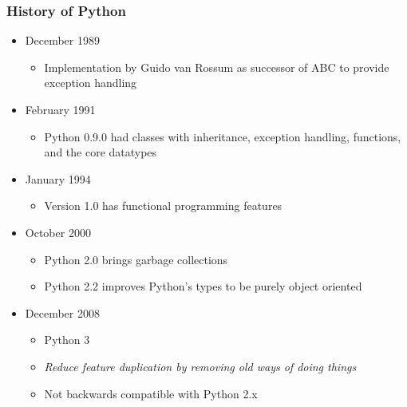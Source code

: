 \documentclass[xcolor=table,10pt,final]{beamer}
\begin{document}
\begin{frame}
  \frametitle{History of Python}
  \begin{itemize}
    \item December 1989
      \begin{itemize}
        \item Implementation by Guido van Rossum as successor of ABC to provide exception handling
      \end{itemize}
    \item February 1991
      \begin{itemize}
        \item Python 0.9.0 had classes with inheritance, exception handling, functions, and the core datatypes
      \end{itemize}
    \item January 1994
      \begin{itemize}
        \item Version 1.0 has functional programming features
      \end{itemize}
    \item October 2000
      \begin{itemize}
        \item Python 2.0 brings garbage collections
        \item Python 2.2 improves Python's types to be purely object oriented
      \end{itemize}
    \item December 2008
      \begin{itemize}
        \item Python 3
        \item {\it Reduce feature duplication by removing old ways of doing things}
        \item Not backwards compatible with Python 2.x
      \end{itemize}
  \end{itemize}
\end{frame}
\end{document}
